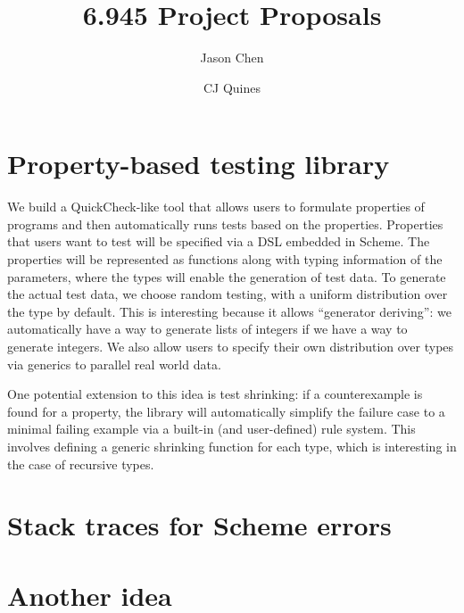 \documentclass{scrartcl}
\title{6.945 Project Proposals}
\author{Jason Chen \and CJ Quines}
\begin{document}
\maketitle

\section{Property-based testing library}
We build a QuickCheck-like tool that allows users to
formulate properties of programs and then
automatically runs tests based on the properties.
Properties that users want to test will be specified
via a DSL embedded in Scheme.
The properties will be represented as functions
along with typing information of the parameters,
where the types will enable the generation of test data.
To generate the actual test data, we choose random testing,
with a uniform distribution over the type by default.
This is interesting because it allows ``generator deriving'':
we automatically have a way to generate lists of integers
if we have a way to generate integers.
We also allow users to specify their own distribution
over types via generics to parallel real world data. %

One potential extension to this idea is test shrinking:
if a counterexample is found for a property,
the library will automatically simplify
the failure case to a minimal failing example
via a built-in (and user-defined) rule system.
This involves defining a generic shrinking function for each type,
which is interesting in the case of recursive types.



\section{Stack traces for Scheme errors}


\section{Another idea}
\end{document}
